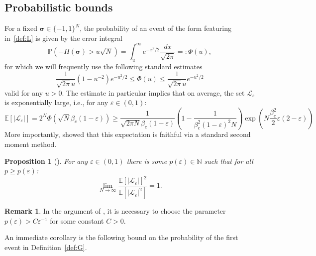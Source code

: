 \documentclass[letterpaper, DIV=17]{scrartcl}
\newtheorem{prop}[theorem]{Proposition}
\numberwithin{equation}{section}
\theoremstyle{definition}
\newtheorem{rem}[theorem]{Remark}
\newcommand{\bsig}{\boldsymbol{\sigma} }
\begin{document}
\subsection{Probabilistic bounds}

 For a fixed $ \bsig \in \{ -1 , 1\}^N $, the probability of an  event of the form featuring in~\eqref{def:L} is given by the error integral 
$$ \mathbb{P}(- H(\bsig) > u \sqrt{N} ) = \int_{u  }^\infty  e^{-x^2/2} \frac{dx}{\sqrt{2\pi}} =: \Phi(u )  ,
$$
for which we will frequently use the following standard estimates
\begin{equation}\label{eq:errorint}
\frac{1}{\sqrt{2\pi} u } \left(1- u^{-2}\right) e^{- u^2/2} \leq \Phi(u) \leq \frac{1}{\sqrt{2\pi} u } e^{- u^2/2}
\end{equation}
 valid for any $ u > 0 $. The estimate in particular implies that on average, the set $ \mathcal{L}_\varepsilon $ is exponentially large, i.e., for any $ \varepsilon \in (0,1) $:
\begin{equation}\label{eq:Llower}
\mathbb{E}\left[| \mathcal{L}_{\varepsilon}  | \right] = 2^N \Phi\left(\sqrt{N} \beta_c (1-\varepsilon)\right) \geq \frac{1}{\sqrt{2\pi N} \beta_c (1-\varepsilon)} \left( 1 - \frac{1}{\beta_c^2 (1-\varepsilon)^2 N} \right) \exp\left(N \frac{\beta_c^2}{2} \varepsilon (2 - \varepsilon) \right) 
\end{equation}
More importantly, 
\cite{GJK25} showed that this expectation is faithful via a standard second moment method.
\begin{prop}[]\label{prop_concentration}
For any $ \varepsilon \in (0,1) $ there is some $ p(\varepsilon) \in \mathbb{N} $ such that for all $ p \geq p(\varepsilon)$:
\begin{equation}
    \lim_{N\to \infty} \frac{\mathbb{E}\left[| \mathcal{L}_{\varepsilon}  | \right]^2 }{\mathbb{E}\left[| \mathcal{L}_{\varepsilon}  |^2 \right]} = 1 . 
\end{equation}
\end{prop}
\begin{rem}
In the argument of \cite{GJK25}, it is necessary to choose the parameter $p(\varepsilon) > C\varepsilon^{-1}$ for some constant $C>0$.
\end{rem}
An immediate corollary is the following bound on the probability of the first event in Definition~\ref{def:G}.
\end{document}
